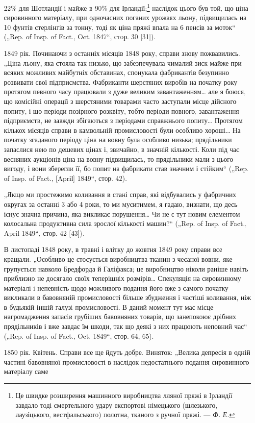 \parcont{}  %
22\% для Шотландії і майже в 90\% для Ірландії;\footnote{
Це швидке розширення машинного виробництва лляної пряжі в Ірландії
завдало тоді смертельного удару експортові німецького (шлезького, лаузіцького,
вестфальського) полотна, тканого з ручної пряжі. — \emph{Ф. Е.}
} наслідок цього
був той, що ціна сировинного матеріалу, при одночасних поганих
урожаях льону, підвищилась на 10 фунтів стерлінгів за
тонну, тоді як ціна пряжі впала на 6 пенсів за моток“ („Rep.
of Insp. of Fact., Oct. 1847“, стор. 30 [31]).

1849 рік. Починаючи з останніх місяців 1848 року, справи
знову пожвавились. „Ціна льону, яка стояла так низько, що забезпечувала
чималий зиск майже при всяких можливих майбутніх
обставинах, спонукала фабрикантів безупинно розвивати свої
підприємства. Фабриканти шерстяних виробів на початку року
протягом певного часу працювали з дуже великим завантаженням\dots{}
але я боюся, що комісійні операції з шерстяними товарами
часто заступали місце дійсного попиту, і що періоди позірного
розквіту, тобто періоди повного, завантаження підприємств, не
завжди збігаються з періодами справжнього попиту\dots{} Протягом
кількох місяців справи в камвольній промисловості були особливо
хороші\dots{} На початку згаданого періоду ціна на вовну була особливо
низька; прядільники запаслися нею по дешевих цінах
і, звичайно, в значній кількості. Коли під час весняних аукціонів
ціна на вовну підвищилась, то прядільники мали з цього вигоду,
і вони зберегли її, бо попит на фабрикати став значним і стійким“
(„Rep. of Insp. of Fact., [April] 1849“, стор. 42).

„Якщо ми простежимо коливання в стані справ, які відбувались
у фабричних округах за останні 3 або 4 роки, то ми муситимем,
я гадаю, визнати, що десь існує значна причина, яка
викликає порушення\dots{} Чи не є тут новим елементом колосальна
продуктивна сила зрослої кількості машин?“ („Rep. of Insp.
of Fact., April 1849“, стор. 42 [43]).

В листопаді 1848 року, в травні і влітку до жовтня 1849 року
справи все кращали. „Особливо це стосується виробництва
тканин з чесаної вовни, яке групується навколо Бредфорда
й Галіфакса; це виробництво ніколи раніше навіть приблизно
не досягало своїх теперішніх розмірів\dots{} Спекуляція на сировинному
матеріалі і непевність щодо можливого подання його
вже з самого початку викликали в бавовняній промисловості
більше збудження і частіші коливання, ніж в будьякій іншій
галузі промисловості. В даний момент тут має місце нагромадження
запасів грубіших бавовняних товарів, що занепокоює
дрібних прядільників і вже завдає їм шкоди, так що деякі з
них працюють неповний час“ („Rep. of Insp. of Fact., Oct. 1849“,
стор. 64, 65).

1850 рік. Квітень. Справи все ще йдуть добре. Виняток:
„Велика депресія в одній частині бавовняної промисловості
в наслідок недостатнього подання сировинного матеріалу саме
\parbreak{}  %
